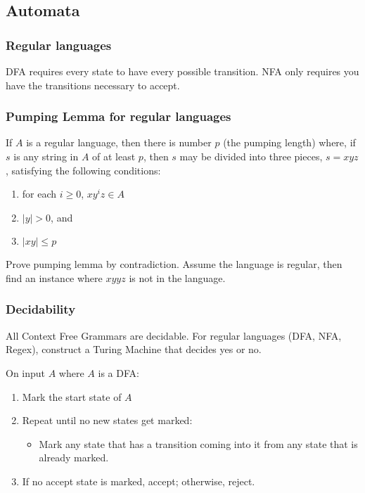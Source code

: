 \documentclass[7pt]{article}
\begin{document}
\begin{multicols*}{4}
\subsection*{Automata}
\subsubsection*{Regular languages}
DFA requires every state to have every possible transition.  NFA only requires you have the transitions necessary to accept.

\subsubsection*{Pumping Lemma for regular languages}
If $A$ is a regular language, then there is number $p$ (the pumping length) where, if $s$ is any string in $A$ of at least $p$, then $s$ may be divided into three pieces, $s = xyz$, satisfying the following conditions:
\begin{enumerate}
\item for each $i \geq 0$, $xy^iz \in A$
\item $|y| > 0$, and
\item $|xy| \leq p$
\end{enumerate}

Prove pumping lemma by contradiction.  Assume the language is regular, then find an instance where $xyyz$ is not in the language.

\subsubsection*{Decidability}
All Context Free Grammars are decidable.  For regular languages (DFA, NFA, Regex), construct a Turing Machine that decides yes or no.

\noindent
On input $A$ where $A$ is a DFA:
\begin{enumerate}
\item Mark the start state of $A$
\item Repeat until no new states get marked:
\begin{itemize}
\item Mark any state that has a transition coming into it from any state that is already marked.
\end{itemize}
\item If no accept state is marked, accept; otherwise, reject.
\end{enumerate}


\end{multicols*}
\end{document}
